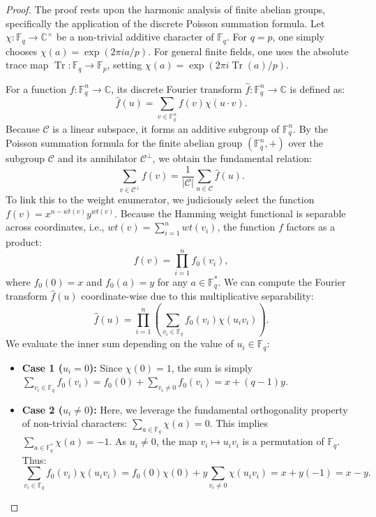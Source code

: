\begin{proof}
The proof rests upon the harmonic analysis of finite abelian groups, specifically the application of the discrete Poisson summation formula. Let $\chi : \mathbb{F}_q \to \mathbb{C}^\times$ be a non-trivial additive character of $\mathbb{F}_q$. For $q=p$, one simply chooses $\chi(a) = \exp(2\pi i a / p)$. For general finite fields, one uses the absolute trace map $\operatorname{Tr}: \mathbb{F}_q \to \mathbb{F}_p$, setting $\chi(a) = \exp(2\pi i \operatorname{Tr}(a) / p)$.

For a function $f : \mathbb{F}_q^n \to \mathbb{C}$, its discrete Fourier transform $\widehat{f} : \mathbb{F}_q^n \to \mathbb{C}$ is defined as:
\[
\widehat{f}(u) = \sum_{v \in \mathbb{F}_q^n} f(v) \chi(u \cdot v).
\]
Because $\mathcal{C}$ is a linear subspace, it forms an additive subgroup of $\mathbb{F}_q^n$. By the Poisson summation formula for the finite abelian group $(\mathbb{F}_q^n, +)$ over the subgroup $\mathcal{C}$ and its annihilator $\mathcal{C}^\perp$, we obtain the fundamental relation:
\[
\sum_{v \in \mathcal{C}^\perp} f(v) = \frac{1}{|\mathcal{C}|} \sum_{u \in \mathcal{C}} \widehat{f}(u).
\]
To link this to the weight enumerator, we judiciously select the function $f(v) = x^{n-wt(v)} y^{wt(v)}$. Because the Hamming weight functional is separable across coordinates, i.e., $wt(v) = \sum_{i=1}^n wt(v_i)$, the function $f$ factors as a product:
\[
f(v) = \prod_{i=1}^n f_0(v_i),
\]
where $f_0(0) = x$ and $f_0(a) = y$ for any $a \in \mathbb{F}_q^*$. We can compute the Fourier transform $\widehat{f}(u)$ coordinate-wise due to this multiplicative separability:
\[
\widehat{f}(u) = \prod_{i=1}^n \left( \sum_{v_i \in \mathbb{F}_q} f_0(v_i) \chi(u_i v_i) \right).
\]
We evaluate the inner sum depending on the value of $u_i \in \mathbb{F}_q$:
\begin{itemize}
    \item \textbf{Case 1 ($u_i = 0$):} Since $\chi(0) = 1$, the sum is simply $\sum_{v_i \in \mathbb{F}_q} f_0(v_i) = f_0(0) + \sum_{v_i \neq 0} f_0(v_i) = x + (q-1)y$.
    \item \textbf{Case 2 ($u_i \neq 0$):} Here, we leverage the fundamental orthogonality property of non-trivial characters: $\sum_{a \in \mathbb{F}_q} \chi(a) = 0$. This implies $\sum_{a \in \mathbb{F}_q^*} \chi(a) = -1$. As $u_i \neq 0$, the map $v_i \mapsto u_i v_i$ is a permutation of $\mathbb{F}_q$. Thus:
    \[
    \sum_{v_i \in \mathbb{F}_q} f_0(v_i) \chi(u_i v_i) = f_0(0)\chi(0) + y \sum_{v_i \neq 0} \chi(u_i v_i) = x + y(-1) = x - y.
    \]
\end{itemize}

\end{proof}
